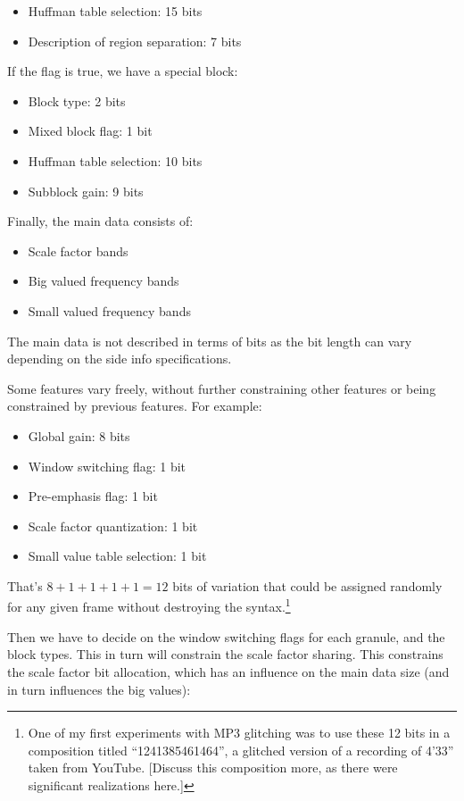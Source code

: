 \documentclass{thesis}
\begin{document}
\begin{itemize}
	\item Huffman table selection: 15 bits
	\item Description of region separation: 7 bits
\end{itemize}

	If the flag is true, we have a special block:
	
\begin{itemize}
	\item Block type: 2 bits
	\item Mixed block flag: 1 bit
	\item Huffman table selection: 10 bits
	\item Subblock gain: 9 bits
\end{itemize}

	Finally, the main data consists of:
	
\begin{itemize}
	\item Scale factor bands
	\item Big valued frequency bands
	\item Small valued frequency bands
\end{itemize}

	The main data is not described in terms of bits as the bit length can vary depending on the side info specifications.

	Some features vary freely, without further constraining other features or being constrained by previous features. For example:

\begin{itemize}
	\item Global gain: 8 bits
	\item Window switching flag: 1 bit
	\item Pre-emphasis flag: 1 bit
	\item Scale factor quantization: 1 bit
	\item Small value table selection: 1 bit
\end{itemize}

	That's $8+1+1+1+1=12$ bits of variation that could be assigned randomly for any given frame without destroying the syntax.\footnote{One of my first experiments with MP3 glitching was to use these 12 bits in a composition titled ``1241385461464'', a glitched version of a recording of 4'33'' taken from YouTube. [Discuss this composition more, as there were significant realizations here.]}
	
	Then we have to decide on the window switching flags for each granule, and the block types. This in turn will constrain the scale factor sharing. This constrains the scale factor bit allocation, which has an influence on the main data size (and in turn influences the big values):
	
\end{document}
